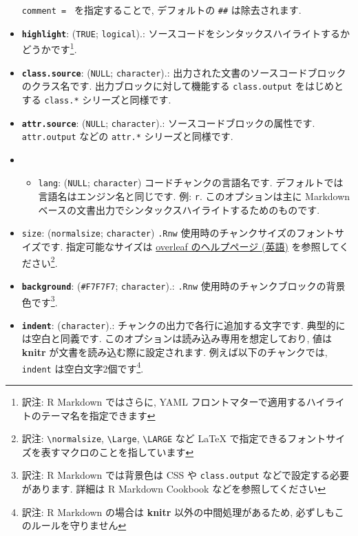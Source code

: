 \documentclass[
  lualatex,ja=standard,jafont=noto-otf]{bxjsreport}
\providecommand{\tightlist}{%
  \setlength{\itemsep}{0pt}\setlength{\parskip}{0pt}}
\begin{document}
\begin{itemize}
  \texttt{comment\ =\ \textquotesingle{}\textquotesingle{}}
  を指定することで, デフォルトの \texttt{\#\#} は除去されます.
\item
  \textbf{\texttt{highlight}}: (\texttt{TRUE}; \texttt{logical}).:
  ソースコードをシンタックスハイライトするかどうかです\footnote{訳注: R
    Markdown ではさらに, YAML
    フロントマターで適用するハイライトのテーマ名を指定できます}.
\item
  \textbf{\texttt{class.source}}: (\texttt{NULL}; \texttt{character}).:
  出力された文書のソースコードブロックのクラス名です.
  出力ブロックに対して機能する \texttt{class.output} をはじめとする
  \texttt{class.*} シリーズと同様です.
\item
  \textbf{\texttt{attr.source}}: (\texttt{NULL}; \texttt{character}).:
  ソースコードブロックの属性です. \texttt{attr.output} などの
  \texttt{attr.*} シリーズと同様です.
\item
  \begin{itemize}
  \tightlist
  \item
    \texttt{lang}: (\texttt{NULL}; \texttt{character})
    コードチャンクの言語名です.
    デフォルトでは言語名はエンジン名と同じです. 例: \texttt{r}.
    このオプションは主に Markdown
    ベースの文書出力でシンタックスハイライトするためのものです.
  \end{itemize}
\item
  \texttt{size}:
  (\texttt{\textquotesingle{}normalsize\textquotesingle{}};
  \texttt{character}) \texttt{.Rnw}
  使用時のチャンクサイズのフォントサイズです. 指定可能なサイズは
  \href{https://www.overleaf.com/learn/latex/Font_sizes,_families,_and_styles}{overleaf
  のヘルプページ (英語)} を参照してください\footnote{訳注:
    \texttt{\textbackslash{}normalsize}, \texttt{\textbackslash{}Large},
    \texttt{\textbackslash{}LARGE} など LaTeX
    で指定できるフォントサイズを表すマクロのことを指しています}.
\item
  \textbf{\texttt{background}}:
  (\texttt{\textquotesingle{}\#F7F7F7\textquotesingle{}};
  \texttt{character}).: \texttt{.Rnw}
  使用時のチャンクブロックの背景色です\footnote{訳注: R Markdown
    では背景色は CSS や \texttt{class.output}
    などで設定する必要があります. 詳細は R Markdown Cookbook
    などを参照してください}.
\item
  \textbf{\texttt{indent}}: (\texttt{character}).:
  チャンクの出力で各行に追加する文字です. 典型的には空白と同義です.
  このオプションは読み込み専用を想定しており, 値は \textbf{knitr}
  が文書を読み込む際に設定されます. 例えば以下のチャンクでは,
  \texttt{indent} は空白文字2個です\footnote{訳注: R Markdown の場合は
    \textbf{knitr} 以外の中間処理があるため,
    必ずしもこのルールを守りません}.


\end{itemize}
\end{document}
